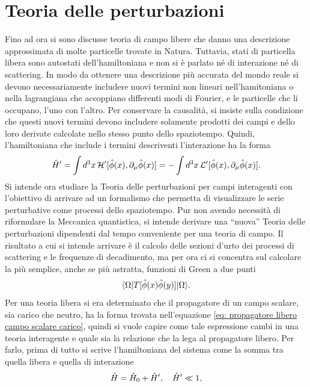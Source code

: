 \chapter{Teoria delle perturbazioni}
Fino ad ora si sono discusse teoria di campo libere che danno una descrizione approssimata di molte particelle trovate in Natura. Tuttavia, stati di particella libera sono autostati dell'hamiltoniana e non si è parlato né di interazione né di scattering. In modo da ottenere una descrizione più accurata del mondo reale si devono necessariamente includere nuovi termini non lineari nell'hamitoniana o nella lagrangiana che accoppiano differenti modi di Fourier, e le particelle che li occupano, l'uno con l'altro. Per conservare la causalità, si insiste sulla condizione che questi nuovi termini devono includere solamente prodotti dei campi e dello loro derivate calcolate nello stesso punto dello spaziotempo. Quindi, l'hamiltoniana che include i termini descriventi l'interazione ha la forma
\begin{equation}
    \hat{H}' = \int d^3x\,\mathcal{H}'[\hat{\phi}(x),\partial_\mu\hat{\phi}(x)] = -\int d^3x\,\mathcal{L}'[\hat{\phi}(x),\partial_\mu\hat{\phi}(x)].
\end{equation}
Si intende ora studiare la Teoria delle perturbazioni per campi interagenti con l'obiettivo di arrivare ad un formalismo che permetta di visualizzare le serie perturbative come processi dello spaziotempo. Pur non avendo necessità di riformulare la Meccanica quantistica, si intende derivare una ``nuova'' Teoria delle perturbazioni dipendenti dal tempo conveniente per una teoria di campo. Il risultato a cui si intende arrivare è il calcolo delle sezioni d'urto dei processi di scattering e le frequenze di decadimento, ma per ora ci si concentra sul calcolare la più semplice, anche se più astratta, funzioni di Green a due punti 
\begin{equation}
    \langle \Omega | T[\hat{\phi}(x)\hat{\phi}(y)] | \Omega \rangle.
\end{equation}
Per una teoria libera si era determinato che il propagatore di un campo scalare, sia carico che neutro, ha la forma trovata nell'equazione \eqref{eq: propagatore libero campo scalare carico}, quindi si vuole capire come tale espressione cambi in una teoria interagente e quale sia la relazione che la lega al propagatore libero. Per farlo, prima di tutto si scrive l'hamiltoniana del sistema come la somma tra quella libera e quella di interazione
\begin{equation}
    \hat{H} = \hat{H}_0 + \hat{H}',\quad \hat{H}' \ll 1,
\end{equation}
